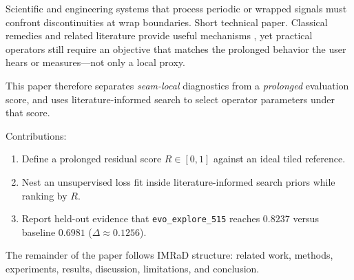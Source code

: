 Scientific and engineering systems that process periodic or wrapped signals must confront discontinuities at wrap boundaries. Short technical paper. Classical remedies and related literature provide useful mechanisms \cite{valimaki2006va}\cite{esqueda2016aliasing}\cite{esqueda2016blamp}, yet practical operators still require an objective that matches the prolonged behavior the user hears or measures---not only a local proxy.

This paper therefore separates \emph{seam-local} diagnostics from a \emph{prolonged} evaluation score, and uses literature-informed search to select operator parameters under that score.

Contributions:

\begin{enumerate}

  \item Define a prolonged residual score $R\in[0,1]$ against an ideal tiled reference.

  \item Nest an unsupervised loss fit inside literature-informed search priors while ranking by $R$.

  \item Report held-out evidence that \texttt{evo\_explore\_515} reaches $0.8237$ versus baseline $0.6981$ ($\Delta\approx0.1256$).

\end{enumerate}

The remainder of the paper follows IMRaD structure: related work, methods, experiments, results, discussion, limitations, and conclusion.
